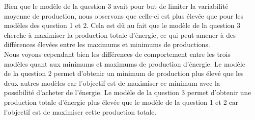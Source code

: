 \documentclass{article}
\begin{document}
\medskip
Bien que le modèle de la question 3 avait pour but de limiter la variabilité moyenne de production, nous observons que celle-ci est plus élevée que pour les modèles des question 1 et 2. Cela est dû au fait que le modèle de la question 3 cherche à maximiser la production totale d'énergie, ce qui peut amener à des différences élevées entre les maximums et minimums de productions.\\
Nous voyons cependant bien les différences de comportement entre les trois modèles quant aux minimums et maximums de production d'énergie. Le modèle de la question 2 permet d'obtenir un minimum de production plus élevé que les deux autres modèles car l'objectif est de maximiser ce minimum avec la possibilité d'acheter de l'énergie. Le modèle de la question 3 permet d'obtenir une production totale d'énergie plus élevée que le modèle de la question 1 et 2 car l'objectif est de maximiser cette production totale.\\
\end{document}
